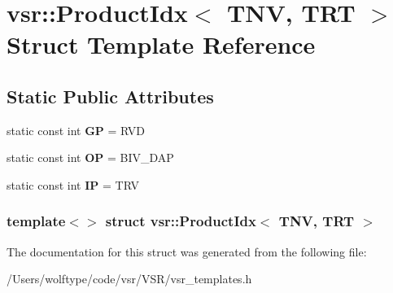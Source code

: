 \hypertarget{structvsr_1_1_product_idx_3_01_t_n_v_00_01_t_r_t_01_4}{\section{vsr\-:\-:Product\-Idx$<$ T\-N\-V, T\-R\-T $>$ Struct Template Reference}
\label{structvsr_1_1_product_idx_3_01_t_n_v_00_01_t_r_t_01_4}
}
\subsection*{Static Public Attributes}
\begin{DoxyCompactItemize}
\item 
\hypertarget{structvsr_1_1_product_idx_3_01_t_n_v_00_01_t_r_t_01_4_a447296842b331169474e33c85c80763c}{static const int {\bfseries G\-P} = R\-V\-D}\label{structvsr_1_1_product_idx_3_01_t_n_v_00_01_t_r_t_01_4_a447296842b331169474e33c85c80763c}

\item 
\hypertarget{structvsr_1_1_product_idx_3_01_t_n_v_00_01_t_r_t_01_4_a9caa8f394c42df5f03c021d11e750cd2}{static const int {\bfseries O\-P} = B\-I\-V\-\_\-\-D\-A\-P}\label{structvsr_1_1_product_idx_3_01_t_n_v_00_01_t_r_t_01_4_a9caa8f394c42df5f03c021d11e750cd2}

\item 
\hypertarget{structvsr_1_1_product_idx_3_01_t_n_v_00_01_t_r_t_01_4_a1a56123555289892e2e29dbc3172c3c3}{static const int {\bfseries I\-P} = T\-R\-V}\label{structvsr_1_1_product_idx_3_01_t_n_v_00_01_t_r_t_01_4_a1a56123555289892e2e29dbc3172c3c3}

\end{DoxyCompactItemize}
\subsubsection*{template$<$$>$ struct vsr\-::\-Product\-Idx$<$ T\-N\-V, T\-R\-T $>$}



The documentation for this struct was generated from the following file\-:\begin{DoxyCompactItemize}
\item 
/\-Users/wolftype/code/vsr/\-V\-S\-R/vsr\-\_\-templates.\-h\end{DoxyCompactItemize}
